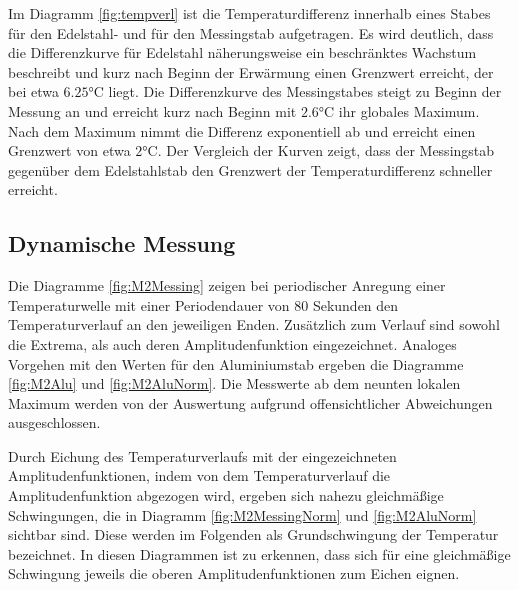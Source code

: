 Im Diagramm \ref{fig:tempverl} ist die Temperaturdifferenz innerhalb eines Stabes für den Edelstahl- und für den Messingstab aufgetragen. 
Es wird deutlich, dass die Differenzkurve für Edelstahl näherungsweise ein beschränktes Wachstum beschreibt und kurz nach Beginn der Erwärmung einen Grenzwert erreicht, der bei etwa  $6.25 \si{\degreeCelsius}$ liegt.
Die Differenzkurve des Messingstabes steigt zu Beginn der Messung an und erreicht kurz nach Beginn mit $2.6 \si{\degreeCelsius}$ ihr globales Maximum. 
Nach dem Maximum nimmt die Differenz exponentiell ab und erreicht einen Grenzwert von etwa $2 \si{\degreeCelsius}$.
Der Vergleich der Kurven zeigt, dass der Messingstab gegenüber dem Edelstahlstab den Grenzwert der Temperaturdifferenz schneller erreicht.

\subsection{Dynamische Messung}
Die Diagramme \ref{fig:M2Messing} zeigen bei periodischer Anregung einer Temperaturwelle mit einer Periodendauer von 80 Sekunden den Temperaturverlauf an den jeweiligen Enden. 
Zusätzlich zum Verlauf sind sowohl die Extrema, als auch deren Amplitudenfunktion eingezeichnet. 
Analoges Vorgehen mit den Werten für den Aluminiumstab ergeben die Diagramme \ref{fig:M2Alu} und \ref{fig:M2AluNorm}.
Die Messwerte ab dem neunten lokalen Maximum werden von der Auswertung aufgrund offensichtlicher Abweichungen ausgeschlossen.

Durch Eichung des Temperaturverlaufs mit der eingezeichneten Amplitudenfunktionen, indem von dem Temperaturverlauf die Amplitudenfunktion abgezogen wird, ergeben sich nahezu gleichmäßige Schwingungen, die in Diagramm \ref{fig:M2MessingNorm} und \ref{fig:M2AluNorm} sichtbar sind. 
Diese werden im Folgenden als Grundschwingung der Temperatur bezeichnet. 
In diesen Diagrammen ist zu erkennen, dass sich für eine gleichmäßige Schwingung jeweils die oberen Amplitudenfunktionen zum Eichen eignen.


